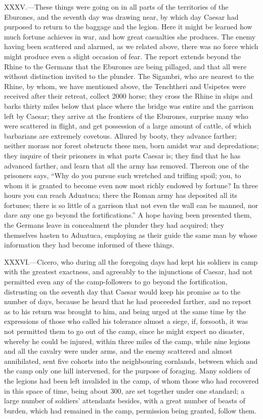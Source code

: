 XXXV.—These things were going on in all parts of the territories of the
Eburones, and the seventh day was drawing near, by which day Caesar had
purposed to return to the baggage and the legion. Here it might be
learned how much fortune achieves in war, and how great casualties she
produces. The enemy having been scattered and alarmed, as we related
above, there was no force which might produce even a slight occasion of
fear. The report extends beyond the Rhine to the Germans that the
Eburones are being pillaged, and that all were without distinction
invited to the plunder. The Sigambri, who are nearest to the Rhine, by
whom, we have mentioned above, the Tenchtheri and Usipetes were received
after their retreat, collect 2000 horse; they cross the Rhine in ships
and barks thirty miles below that place where the bridge was entire and
the garrison left by Caesar; they arrive at the frontiers of the
Eburones, surprise many who were scattered in flight, and get possession
of a large amount of cattle, of which barbarians are extremely covetous.
Allured by booty, they advance farther; neither morass nor forest
obstructs these men, born amidst war and depredations; they inquire of
their prisoners in what parts Caesar is; they find that he has advanced
farther, and learn that all the army has removed. Thereon one of the
prisoners says, ``Why do you pursue such wretched and trifling spoil;
you, to whom it is granted to become even now most richly endowed by
fortune? In three hours you can reach Aduatuca; there the Roman army has
deposited all its fortunes; there is so little of a garrison that not
even the wall can be manned, nor dare any one go beyond the
fortifications.'' A hope having been presented them, the Germans leave in
concealment the plunder they had acquired; they themselves hasten to
Aduatuca, employing as their guide the same man by whose information
they had become informed of these things.

XXXVI.—Cicero, who during all the foregoing days had kept his soldiers
in camp with the greatest exactness, and agreeably to the injunctions of
Caesar, had not permitted even any of the camp-followers to go beyond
the fortification, distrusting on the seventh day that Caesar would keep
his promise as to the number of days, because he heard that he had
proceeded farther, and no report as to his return was brought to him,
and being urged at the same time by the expressions of those who called
his tolerance almost a siege, if, forsooth, it was not permitted them to
go out of the camp, since he might expect no disaster, whereby he could
be injured, within three miles of the camp, while nine legions and all
the cavalry were under arms, and the enemy scattered and almost
annihilated, sent five cohorts into the neighbouring cornlands, between
which and the camp only one hill intervened, for the purpose of
foraging. Many soldiers of the legions had been left invalided in the
camp, of whom those who had recovered in this space of time, being about
300, are set together under one standard; a large number of soldiers'
attendants besides, with a great number of beasts of burden, which had
remained in the camp, permission being granted, follow them.

